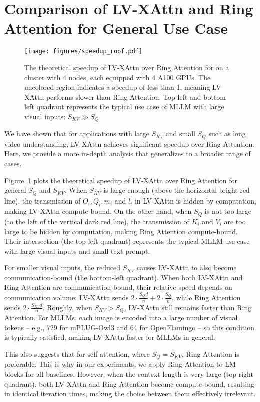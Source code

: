 \section{Comparison of LV-XAttn and Ring Attention for General Use Case}
\label{appendix:analysis}
\begin{figure}[t]
    \centering
    \texttt{[image: figures/speedup\_roof.pdf]}
    \caption{The theoretical speedup of LV-XAttn over Ring Attention for on a cluster with 4 nodes, each equipped with 4 A100 GPUs. The uncolored region indicates a speedup of less than 1, meaning LV-XAttn performs slower than Ring Attention. Top-left and bottom-left quadrant represents the typical use case of MLLM with large visual inputs: $S_{KV} \gg S_Q$.}
    \label{fig:speedup_appdx}
\end{figure}
We have shown that for applications with large $S_{KV}$ and small $S_Q$ such as long video understanding, LV-XAttn achieves significant speedup over Ring Attention. Here, we provide a more in-depth analysis that generalizes to a broader range of cases.

Figure~\ref{fig:speedup_appdx} plots the theoretical speedup of LV-XAttn over Ring Attention for general $S_Q$ and $S_{KV}$. When $S_{KV}$ is large enough (above the horizontal bright red line), the transmission of $O_i, Q_i, m_i$ and $l_i$ in LV-XAttn is hidden by computation, making LV-XAttn compute-bound. On the other hand, when $S_{Q}$ is not too large (to the left of the vertical dark red line), the transmission of $K_i$ and $V_i$ are too large to be hidden by computation, making Ring Attention compute-bound. Their intersection (the top-left quadrant) represents the typical MLLM use case with large visual inputs and small text prompt.

For smaller visual inputs, the reduced $S_{KV}$ causes LV-XAttn to also become communication-bound (the bottom-left quadrant). When both LV-XAttn and Ring Attention are communication-bound, their relative speed depends on communication volume: LV-XAttn sends $2\cdot \frac{S_Qd}{n} + 2\cdot\frac{S_Q}{n}$, while Ring Attention sends $2\cdot \frac{S_{KV}d}{n}$. Roughly, when $S_{KV} > S_{Q}$, LV-XAttn still remains faster than Ring Attention. For MLLMs, each image is encoded into a large number of visual tokens -- e.g., 729 for mPLUG-Owl3 and 64 for OpenFlamingo -- so this condition is typically satisfied, making LV-XAttn faster for MLLMs in general.

This also suggests that for self-attention, where $S_Q = S_{KV}$, Ring Attention is preferable. This is why in our experiments, we apply Ring Attention to LM blocks for all baselines. However, when the context length is very large (top-right quadrant), both LV-XAttn and Ring Attention become compute-bound, resulting in identical iteration times, making the choice between them effectively irrelevant.